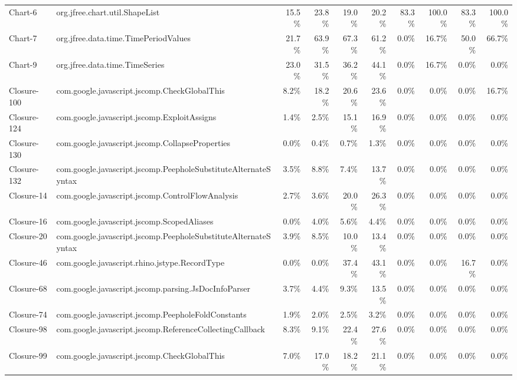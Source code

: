 \begin{tabular}{ ll rrrr rrrr}
Chart-6 &  org.jfree.chart.util.ShapeList &  15.5\% &  23.8\% &  19.0\% &  20.2\% &  83.3\% &  100.0\% &  83.3\% &  100.0\%\\ 
Chart-7 &  org.jfree.data.time.TimePeriodValues &  21.7\% &  63.9\% &  67.3\% &  61.2\% &  0.0\% &  16.7\% &  50.0\% &  66.7\%\\ 
Chart-9 &  org.jfree.data.time.TimeSeries &  23.0\% &  31.5\% &  36.2\% &  44.1\% &  0.0\% &  16.7\% &  0.0\% &  0.0\%\\ 
Closure-100 &  com.google.javascript.jscomp.CheckGlobalThis &  8.2\% &  18.2\% &  20.6\% &  23.6\% &  0.0\% &  0.0\% &  0.0\% &  16.7\%\\ 
Closure-124 &  com.google.javascript.jscomp.ExploitAssigns &  1.4\% &  2.5\% &  15.1\% &  16.9\% &  0.0\% &  0.0\% &  0.0\% &  0.0\%\\ 
Closure-130 &  com.google.javascript.jscomp.CollapseProperties &  0.0\% &  0.4\% &  0.7\% &  1.3\% &  0.0\% &  0.0\% &  0.0\% &  0.0\%\\ 
Closure-132 &  com.google.javascript.jscomp.PeepholeSubstituteAlternateSyntax &  3.5\% &  8.8\% &  7.4\% &  13.7\% &  0.0\% &  0.0\% &  0.0\% &  0.0\%\\ 
Closure-14 &  com.google.javascript.jscomp.ControlFlowAnalysis &  2.7\% &  3.6\% &  20.0\% &  26.3\% &  0.0\% &  0.0\% &  0.0\% &  0.0\%\\ 
Closure-16 &  com.google.javascript.jscomp.ScopedAliases &  0.0\% &  4.0\% &  5.6\% &  4.4\% &  0.0\% &  0.0\% &  0.0\% &  0.0\%\\ 
Closure-20 &  com.google.javascript.jscomp.PeepholeSubstituteAlternateSyntax &  3.9\% &  8.5\% &  10.0\% &  13.4\% &  0.0\% &  0.0\% &  0.0\% &  0.0\%\\ 
Closure-46 &  com.google.javascript.rhino.jstype.RecordType &  0.0\% &  0.0\% &  37.4\% &  43.1\% &  0.0\% &  0.0\% &  16.7\% &  0.0\%\\ 
Closure-68 &  com.google.javascript.jscomp.parsing.JsDocInfoParser &  3.7\% &  4.4\% &  9.3\% &  13.5\% &  0.0\% &  0.0\% &  0.0\% &  0.0\%\\ 
Closure-74 &  com.google.javascript.jscomp.PeepholeFoldConstants &  1.9\% &  2.0\% &  2.5\% &  3.2\% &  0.0\% &  0.0\% &  0.0\% &  0.0\%\\ 
Closure-98 &  com.google.javascript.jscomp.ReferenceCollectingCallback &  8.3\% &  9.1\% &  22.4\% &  27.6\% &  0.0\% &  0.0\% &  0.0\% &  0.0\%\\ 
Closure-99 &  com.google.javascript.jscomp.CheckGlobalThis &  7.0\% &  17.0\% &  18.2\% &  21.1\% &  0.0\% &  0.0\% &  0.0\% &  0.0\%\\ 

\end{tabular}
